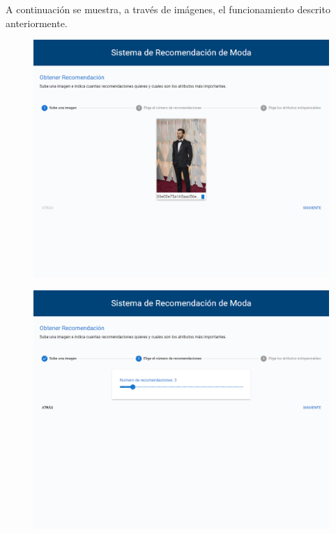 \documentclass[12pt]{report} %
\begin{document}
\begin{itemize}
		A continuación se muestra, a través de imágenes, el funcionamiento descrito anteriormente.
		\begin{figure}[H]
			{\includegraphics[scale=0.3]{pantalla-1.png}}
		\end{figure}
		\begin{figure}[H]
			{\includegraphics[scale=0.3]{pantalla-2.png}}
		\end{figure}
		\begin{figure}[H]

\end{figure}
\end{itemize}
\end{document}
